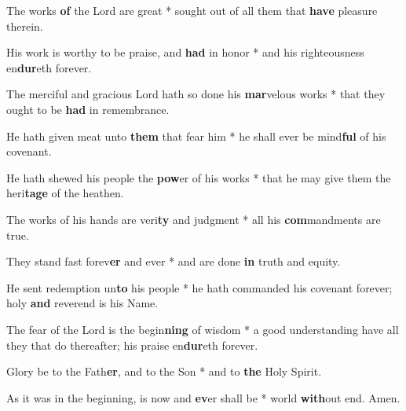 \begin{multicols}{2}
	The works \textbf{of} the Lord are great * sought out of all them that \textbf{have} pleasure therein.
	
	His work is worthy to be praise, and \textbf{had} in honor * and his righteousness en\textbf{dur}eth forever.
	
	The merciful and gracious Lord hath so done his \textbf{mar}velous works * that they ought to be \textbf{had} in remembrance.
	
	He hath given meat unto \textbf{them} that fear him * he shall ever be mind\textbf{ful} of his covenant.
	
	He hath shewed his people the \textbf{pow}er of his works * that he may give them the heri\textbf{tage} of the heathen.
	
	The works of his hands are veri\textbf{ty} and judgment * all his \textbf{com}mandments are true.
	
	They stand fast forev\textbf{er} and ever * and are done \textbf{in} truth and equity.
	
	He sent redemption un\textbf{to} his people * he hath commanded his covenant forever; holy \textbf{and} reverend is his Name.
	
	The fear of the Lord is the begin\textbf{ning} of wisdom * a good understanding have all they that do thereafter; his praise en\textbf{dur}eth forever.
	
	Glory be to the Fath\textbf{er}, and to the Son * and to \textbf{the} Holy Spirit.
	
	As it was in the beginning, is now and \textbf{ev}er shall be * world \textbf{with}out end. Amen.
\end{multicols}